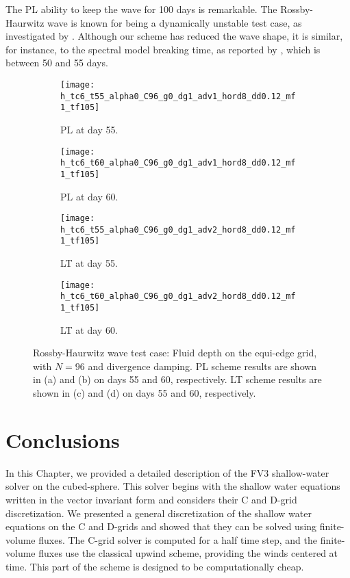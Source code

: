The PL ability to keep the wave for 100 days is remarkable.
The Rossby-Haurwitz wave is known for being a dynamically unstable test case, as investigated by \citet{thuburn:2000}. 
Although our scheme has reduced the wave shape, it is similar,
for instance, to the spectral model breaking time, as reported by \citet{thuburn:2000}, which is between 50 and 55 days.
\begin{figure}[!h]
	\centering
	\begin{subfigure}{0.49\textwidth}
		\centering
		\texttt{[image: h\_tc6\_t55\_alpha0\_C96\_g0\_dg1\_adv1\_hord8\_dd0.12\_mf1\_tf105]}
		\caption{PL at day 55.\label{sw-rossby-h-d60-pl-div-g0}}
	\end{subfigure}
	\begin{subfigure}{0.49\textwidth}
		\centering
		\texttt{[image: h\_tc6\_t60\_alpha0\_C96\_g0\_dg1\_adv1\_hord8\_dd0.12\_mf1\_tf105]}
		\caption{PL at day 60.\label{sw-rossby-h-d65-pl-div-g0}}
	\end{subfigure}
	
	\begin{subfigure}{0.49\textwidth}
		\centering
		\texttt{[image: h\_tc6\_t55\_alpha0\_C96\_g0\_dg1\_adv2\_hord8\_dd0.12\_mf1\_tf105]}
		\caption{LT at day 55.\label{sw-rossby-h-d60-lt-div-g0}}
	\end{subfigure}
	\begin{subfigure}{0.49\textwidth}
		\centering
		\texttt{[image: h\_tc6\_t60\_alpha0\_C96\_g0\_dg1\_adv2\_hord8\_dd0.12\_mf1\_tf105]}
		\caption{LT at day 60.\label{sw-rossby-h-d65-lt-div-g0}}
	\end{subfigure}
	\caption{Rossby-Haurwitz wave test case:
		Fluid depth on the equi-edge grid, with $N=96$ and divergence damping.
		PL scheme results are shown in (a) and (b) on days 55 and 60, respectively.
		LT scheme results are shown in (c) and (d) on days 55 and 60, respectively.
		\label{sw-rossby-h-div-g0}}
\end{figure}







\section{Conclusions}
\label{sec:conclusions}
In this Chapter, we provided a detailed description of the FV3 shallow-water solver on the cubed-sphere. 
This solver begins with the shallow water equations written in the vector invariant form and considers their C and D-grid discretization.
We presented a general discretization of the shallow water equations on the C and D-grids and showed that they can be solved using finite-volume fluxes.
The C-grid solver is computed for a half time step, and the finite-volume fluxes use the classical upwind scheme, providing the winds centered at time.
This part of the scheme is designed to be computationally cheap.

